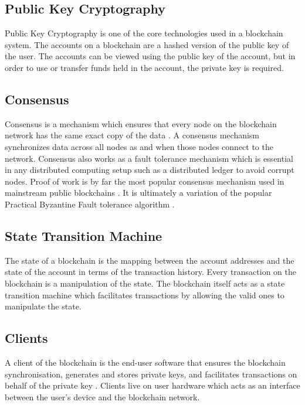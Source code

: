 \documentclass[a4paper,twoside,phd]{BYUPhys}
\begin{document}
\subsection{Public Key Cryptography}
Public Key Cryptography is one of the core technologies used in a blockchain system. The accounts on a blockchain are a hashed version of the public key of the user\cite{Wood2018ETHEREUM:LEDGER}. The accounts can be viewed using the public key of the account, but in order to use or transfer funds held in the account, the private key is required\cite{ButerinAPLATFORM}.
\subsection{Consensus}
Consensus is a mechanism which ensures that every node on the blockchain network has the same exact copy of the data \cite{ChrisHammerschmidt2017ConsensusMedium}. A consensus mechanism synchronizes data across all nodes as and when those nodes connect to the network\cite{TendermintTeam2018WhatDocumentation}. Consensus also works as a fault tolerance mechanism which is essential in any distributed computing setup such as a distributed ledger to avoid corrupt nodes\cite{ConsensusInvestopedia}. Proof of work is by far the most popular consensus mechanism used in mainstream public blockchains \cite{RayahMajor2018Proof-of-StakePOW}. It is ultimately a variation of the popular Practical Byzantine Fault tolerance algorithm \cite{RayahMajor2018Proof-of-StakePOW}.
\subsection{State Transition Machine}
The state of a blockchain is the mapping between the account addresses and the state of the account in terms of the transaction history\cite{Wood2018ETHEREUM:LEDGER}. Every transaction on the blockchain is a manipulation of the state. The blockchain itself acts as a state transition machine which facilitates transactions by allowing the valid ones to manipulate the state\cite{ButerinAPLATFORM}.
\subsection{Clients}
A client of the blockchain is the end-user software that ensures the blockchain synchronisation, generates and stores private keys, and facilitates transactions on behalf of the private key \cite{2018ClientsWiki}. Clients live on user hardware which acts as an interface between the user's device and the blockchain network\cite{ButerinAPLATFORM}.
\end{document}
